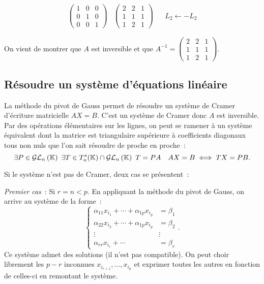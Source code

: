 \begin{align}
  \begin{pmatrix}  1 & 0 & 0 \\ 0 & 1 & 0\\ 0 & 0 & 1\end{pmatrix} & \begin{pmatrix} 2 & 2 & 1 \\ 1 & 1 & 1\\ 1 & 2 & 1 \end{pmatrix} && L_2 \leftarrow -L_2
\end{align}

On vient de montrer que \(A\) est inversible et que \(A^{-1} = \begin{pmatrix} 2 & 2 & 1 \\ 1 & 1 & 1\\ 1 & 2 & 1 \end{pmatrix}\).

\subsection{Résoudre un système d'équations linéaire}

La méthode du pivot de Gauss permet de résoudre un système de Cramer d'écriture matricielle \(AX = B\). C'est un système de Cramer donc \(A\) est inversible. Par des opérations élémentaires sur les lignes, on peut se ramener à un système équivalent dont la matrice est triangulaire supérieure à coefficients diagonaux tous non nuls que l'on sait résoudre de proche en proche~:
\begin{equation}
  \exists P \in \mathcal{GL}_{n}\left(\mathbb{K}\right) \ \exists T \in T_n^s(\mathbb{K}) \cap \mathcal{GL}_{n}\left(\mathbb{K}\right) \ T = PA \quad AX = B \iff TX = PB.
\end{equation}

Si le système n'est pas de Cramer, deux cas se présentent~:

\emph{Premier cas}~: Si \(r = n < p\). En appliquant la méthode du pivot de Gauss, on arrive au système de la forme~:
\begin{equation}
  \begin{cases}
    \alpha_{11}x_{i_1} + \dotsb + \alpha_{1p}x_{i_p} & = \beta_1 \\
    \alpha_{22}x_{i_2} + \dotsb + \alpha_{1p}x_{i_p} & = \beta_2 \\
    \vdots & \vdots \\
    \alpha_{rr}x_{i_r} + \dotsb  & = \beta_r
  \end{cases}.
\end{equation}
Ce système admet des solutions (il n'est pas compatible). On peut choir librement les \(p-r\) inconnues \(x_{i_{r+1}}, \ldots, x_{i_p}\) et exprimer toutes les autres en fonction de celles-ci en remontant le système.

